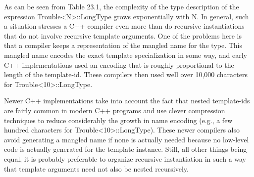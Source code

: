 As can be seen from Table 23.1, the complexity of the type description of the expression Trouble<N>::LongType grows exponentially with N. In general, such a situation stresses a C++ compiler even more than do recursive instantiations that do not involve recursive template arguments. One of the problems here is that a compiler keeps a representation of the mangled name for the type. This mangled name encodes the exact template specialization in some way, and early C++ implementations used an encoding that is roughly proportional to the length of the template-id. These compilers then used well over 10,000 characters for Trouble<10>::LongType.

Newer C++ implementations take into account the fact that nested template-ids are fairly common in modern C++ programs and use clever compression techniques to reduce considerably the growth in name encoding (e.g., a few hundred characters for Trouble<10>::LongType). These newer compilers also avoid generating a mangled name if none is actually needed because no low-level code is actually generated for the template instance. Still, all other things being equal, it is probably preferable to organize recursive instantiation in such a way that template arguments need not also be nested recursively.

















